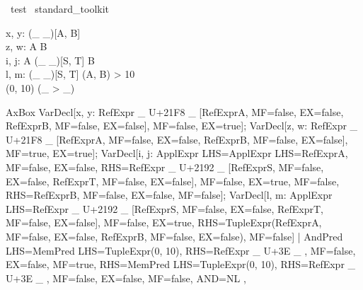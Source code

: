 
\begin{zsection}
  \SECTION\ test \parents\ standard\_toolkit
\end{zsection}

\begin{axdef}
   x, y: (\_ \pfun \_)[A, B] \\   
   z, w: A \pfun B \\
   i, j: A (\_ \fun\_)[S, T] B \\
   l, m: (\_ \fun\_)[S, T] (A, B)
 > 10 \\
   (0, 10) \in (\_ > \_) 
\end{axdef}


AxBox{
 VarDecl[x, y: RefExpr{ _ U+21F8 _ [RefExpr{A, MF=false, EX=false}, RefExpr{B, MF=false, EX=false}], MF=false, EX=true}];
 VarDecl[z, w: RefExpr{ _ U+21F8 _ [RefExpr{A, MF=false, EX=false}, RefExpr{B, MF=false, EX=false}], MF=true, EX=true}];
 VarDecl[i, j: 
    ApplExpr{
        LHS=ApplExpr{
            LHS=RefExpr{A, MF=false, EX=false}, 
            RHS=RefExpr{ _ U+2192 _ [RefExpr{S, MF=false, EX=false}, RefExpr{T, MF=false, EX=false}], MF=false, EX=true}, 
            MF=false}, 
        RHS=RefExpr{B, MF=false, EX=false}, 
        MF=false}];
 VarDecl[l, m: 
    ApplExpr{
        LHS=RefExpr{ _ U+2192 _ [RefExpr{S, MF=false, EX=false}, RefExpr{T, MF=false, EX=false}], MF=false, EX=true}, 
        RHS=TupleExpr(RefExpr{A, MF=false, EX=false}, RefExpr{B, MF=false, EX=false}), 
        MF=false}] 
 | 
 AndPred{
    LHS=MemPred{
        LHS=TupleExpr(0, 10), 
        RHS=RefExpr{ _ U+3E _ , MF=false, EX=false}, 
        MF=true}, 
    RHS=MemPred{
        LHS=TupleExpr(0, 10), 
        RHS=RefExpr{ _ U+3E _ , MF=false, EX=false}, 
        MF=false}, 
    AND=NL}
},


 
